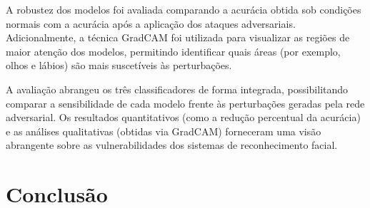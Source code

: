 \documentclass[12pt]{article}
\begin{document}
A robustez dos modelos foi avaliada comparando a acurácia obtida sob condições
normais com a acurácia após a aplicação dos ataques adversariais.
Adicionalmente, a técnica GradCAM foi utilizada para visualizar as regiões de
maior atenção dos modelos, permitindo identificar quais áreas (por exemplo,
olhos e lábios) são mais suscetíveis às perturbações.

A avaliação abrangeu os três classificadores de forma integrada, possibilitando
comparar a sensibilidade de cada modelo frente às perturbações geradas pela
rede adversarial. Os resultados quantitativos (como a redução percentual da
acurácia) e as análises qualitativas (obtidas via GradCAM) forneceram uma visão
abrangente sobre as vulnerabilidades dos sistemas de reconhecimento facial.

\section{Conclusão}



\nocite{*}
\end{document}
